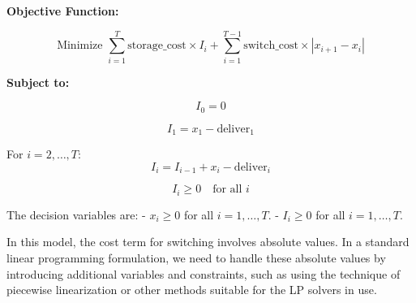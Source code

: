 \documentclass{article}
\begin{document}
\textbf{Objective Function:}

\[
\text{Minimize } \sum_{i=1}^{T} \text{storage\_cost} \times I_i + \sum_{i=1}^{T-1} \text{switch\_cost} \times |x_{i+1} - x_i|
\]

\textbf{Subject to:}

\[
I_0 = 0
\]

\[
I_1 = x_1 - \text{deliver}_1
\]

For \( i = 2, \ldots, T \):
\[
I_i = I_{i-1} + x_i - \text{deliver}_i
\]

\[
I_i \geq 0 \quad \text{for all } i
\]

The decision variables are:
- \( x_i \geq 0 \) for all \( i = 1, \ldots, T \).
- \( I_i \geq 0 \) for all \( i = 1, \ldots, T \).

In this model, the cost term for switching involves absolute values. In a standard linear programming formulation, we need to handle these absolute values by introducing additional variables and constraints, such as using the technique of piecewise linearization or other methods suitable for the LP solvers in use.
\end{document}
